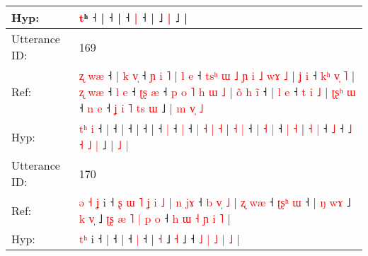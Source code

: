 \documentclass[10pt]{article}
\DeclareRobustCommand{\hl}[1]{{\textcolor{red}{#1}}}
\begin{document}
\begin{longtable}{ll}
 \\
Hyp: & \hl{t}ʰ\hl{}\hl{}\hl{}\hl{}\hl{}\hl{}\hl{}\hl{}\hl{} ˧ |\hl{}\hl{}\hl{}\hl{}\hl{}\hl{}\hl{}\hl{}\hl{}\hl{} ˧\hl{} |\hl{}\hl{}\hl{}\hl{} ˧\hl{}\hl{}\hl{} \hl{|} ˧\hl{}\hl{}\hl{}\hl{}\hl{}\hl{}\hl{}\hl{} \hl{|} ˩\hl{}\hl{} \hl{|} ˩ |
 \\
\midrule
Utterance ID: & 169 \\
Ref: & \hl{ʐ}\hl{ }\hl{w}\hl{æ} ˧ |\hl{ }\hl{k}\hl{ }\hl{v}\hl{̩} ˧\hl{ }\hl{ɲ}\hl{ }\hl{i}\hl{ }\hl{˥} |\hl{ }\hl{l}\hl{ }\hl{e} ˧\hl{ }\hl{t}\hl{s}\hl{ʰ}\hl{ }\hl{ɯ}\hl{ }\hl{˩}\hl{ }\hl{ɲ}\hl{ }\hl{i}\hl{ }\hl{˩}\hl{ }\hl{w}\hl{ɤ}\hl{ }\hl{˩} |\hl{ }\hl{ʝ}\hl{ }\hl{i} ˧\hl{ }\hl{k}\hl{ʰ}\hl{ }\hl{v}\hl{̩}\hl{ }\hl{˥} |\hl{ }\hl{ʐ}\hl{ }\hl{w}\hl{æ} ˧\hl{ }\hl{l} \hl{e} ˧\hl{ }\hl{ʈ}\hl{ʂ} \hl{æ} ˧\hl{ }\hl{p}\hl{ }\hl{o} \hl{˥} \hl{h} \hl{ɯ} \hl{˩} |\hl{ }\hl{o}\hl{̃} \hl{h} \hl{i}\hl{̃} ˧ | \hl{l} \hl{e} ˧\hl{ }\hl{t} \hl{i} \hl{˩} | \hl{ʈ}\hl{ʂ}\hl{ʰ} \hl{ɯ} ˧\hl{ }\hl{n} \hl{e} ˧\hl{ }\hl{ʝ} \hl{i} \hl{˥} \hl{t}\hl{s} \hl{ɯ} ˩ |\hl{ }\hl{m} \hl{v}\hl{̩} \hl{˩}
 \\
Hyp: & \hl{t}\hl{ʰ}\hl{ }\hl{i} ˧ |\hl{}\hl{}\hl{}\hl{}\hl{} ˧\hl{}\hl{}\hl{}\hl{}\hl{}\hl{} |\hl{}\hl{}\hl{}\hl{} ˧\hl{}\hl{}\hl{}\hl{}\hl{}\hl{}\hl{}\hl{}\hl{}\hl{}\hl{}\hl{}\hl{}\hl{}\hl{}\hl{}\hl{}\hl{}\hl{} |\hl{}\hl{}\hl{}\hl{} ˧\hl{}\hl{}\hl{}\hl{}\hl{}\hl{}\hl{}\hl{} |\hl{}\hl{}\hl{}\hl{}\hl{} ˧\hl{}\hl{} \hl{|} ˧\hl{}\hl{}\hl{} \hl{|} ˧\hl{}\hl{}\hl{}\hl{} \hl{|} \hl{˧} \hl{|} \hl{˧} |\hl{}\hl{}\hl{} \hl{˧} \hl{}\hl{|} ˧ | \hl{˧} \hl{|} ˧\hl{}\hl{} \hl{|} \hl{˧} | \hl{}\hl{}\hl{˧} \hl{|} ˧\hl{}\hl{} \hl{˩} ˧\hl{}\hl{} \hl{˩} \hl{˧} \hl{}\hl{˩} \hl{|} ˩ |\hl{}\hl{} \hl{}\hl{˩} \hl{|}
 \\
\midrule
Utterance ID: & 170 \\
Ref: & \hl{ə}\hl{ }\hl{˧}\hl{ }\hl{ʝ} i ˧\hl{ }\hl{ʂ}\hl{ }\hl{ɯ}\hl{ }\hl{˥}\hl{ }\hl{ʝ}\hl{ }\hl{i}\hl{ }\hl{˩} |\hl{ }\hl{n}\hl{ }\hl{j}\hl{ɤ} ˧\hl{ }\hl{b}\hl{ }\hl{v}\hl{̩}\hl{ }\hl{˩} |\hl{ }\hl{ʐ}\hl{ }\hl{w}\hl{æ} ˧\hl{ }\hl{ʈ}\hl{ʂ}\hl{ʰ} \hl{ɯ} ˧ |\hl{ }\hl{ŋ} \hl{w}\hl{ɤ} ˩\hl{ }\hl{k} \hl{v}\hl{̩} ˩\hl{ }\hl{ʈ}\hl{ʂ}\hl{ }\hl{æ}\hl{ }\hl{˥}\hl{ }\hl{|}\hl{ }\hl{p}\hl{ }\hl{o} ˧\hl{ }\hl{h} \hl{ɯ} \hl{˧} \hl{ɲ} \hl{i} \hl{˥} |
 \\
Hyp: & \hl{}\hl{}\hl{}\hl{t}\hl{ʰ} i ˧\hl{}\hl{}\hl{}\hl{}\hl{}\hl{}\hl{}\hl{}\hl{}\hl{}\hl{}\hl{} |\hl{}\hl{}\hl{}\hl{}\hl{} ˧\hl{}\hl{}\hl{}\hl{}\hl{}\hl{}\hl{} |\hl{}\hl{}\hl{}\hl{}\hl{} ˧\hl{}\hl{}\hl{}\hl{} \hl{|} ˧ |\hl{}\hl{} \hl{}\hl{˧} ˩\hl{}\hl{} \hl{}\hl{˧} ˩\hl{}\hl{}\hl{}\hl{}\hl{}\hl{}\hl{}\hl{}\hl{}\hl{}\hl{}\hl{}\hl{} ˧\hl{}\hl{} \hl{˩} \hl{|} \hl{˩} \hl{|} \hl{˩} |

\end{longtable}
\end{document}
